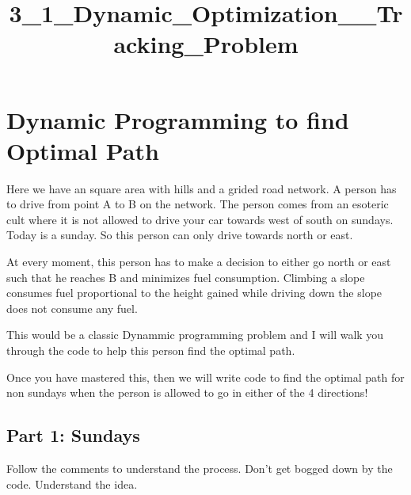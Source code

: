 \documentclass[11pt]{article}
\title{3\_1\_Dynamic\_Optimization\_\_Tracking\_Problem}
\begin{document}
    
    
    \maketitle
    
    

    
    \section{Dynamic Programming to find Optimal
Path}\label{dynamic-programming-to-find-optimal-path}

Here we have an square area with hills and a grided road network. A
person has to drive from point A to B on the network. The person comes
from an esoteric cult where it is not allowed to drive your car towards
west of south on sundays. Today is a sunday. So this person can only
drive towards north or east.

At every moment, this person has to make a decision to either go north
or east such that he reaches B and minimizes fuel consumption. Climbing
a slope consumes fuel proportional to the height gained while driving
down the slope does not consume any fuel.

This would be a classic Dynammic programming problem and I will walk you
through the code to help this person find the optimal path.

Once you have mastered this, then we will write code to find the optimal
path for non sundays when the person is allowed to go in either of the 4
directions!

    \subsection{Part 1: Sundays}\label{part-1-sundays}

Follow the comments to understand the process. Don't get bogged down by
the code. Understand the idea.
\end{document}
